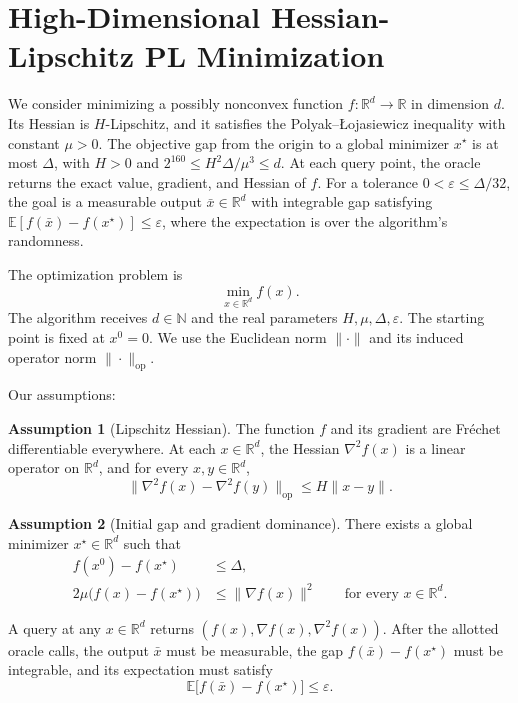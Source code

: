 \documentclass[10pt]{article}
\theoremstyle{definition}
\newtheorem{assumption}{Assumption}
\begin{document}
\section*{High-Dimensional Hessian-Lipschitz PL Minimization}
We consider minimizing a possibly nonconvex function $f:\mathbb{R}^d\to\mathbb{R}$ in dimension $d$. Its Hessian is $H$-Lipschitz, and it satisfies the Polyak--{\L}ojasiewicz inequality with constant $\mu>0$. The objective gap from the origin to a global minimizer $x^\star$ is at most $\Delta$, with $H>0$ and $2^{160}\leq H^2\Delta/\mu^3\leq d$. At each query point, the oracle returns the exact value, gradient, and Hessian of $f$. For a tolerance $0<\varepsilon\leq\Delta/32$, the goal is a measurable output $\bar{x}\in\mathbb{R}^d$ with integrable gap satisfying $\mathbb{E}[f(\bar{x})-f(x^\star)]\leq\varepsilon$, where the expectation is over the algorithm's randomness.

The optimization problem is
\[
\min_{x\in\mathbb{R}^d} f(x).
\]
The algorithm receives $d\in\mathbb{N}$ and the real parameters $H,\mu,\Delta,\varepsilon$. The starting point is fixed at $x^0=0$. We use the Euclidean norm $\|\cdot\|$ and its induced operator norm $\|\cdot\|_{\mathrm{op}}$.

Our assumptions:
\begin{assumption}[Lipschitz Hessian]
The function $f$ and its gradient are Fr\'echet differentiable everywhere. At each $x\in\mathbb{R}^d$, the Hessian $\nabla^2 f(x)$ is a linear operator on $\mathbb{R}^d$, and for every $x,y\in\mathbb{R}^d$,
\[
\|\nabla^2 f(x)-\nabla^2 f(y)\|_{\mathrm{op}}\leq H\|x-y\|.
\]
\end{assumption}

\begin{assumption}[Initial gap and gradient dominance]
There exists a global minimizer $x^\star\in\mathbb{R}^d$ such that
\[
\begin{aligned}
f(x^0)-f(x^\star)&\leq\Delta,\\
2\mu\bigl(f(x)-f(x^\star)\bigr)&\leq\|\nabla f(x)\|^2
\qquad\text{for every }x\in\mathbb{R}^d.
\end{aligned}
\]
\end{assumption}

A query at any $x\in\mathbb{R}^d$ returns $(f(x),\nabla f(x),\nabla^2 f(x))$. After the allotted oracle calls, the output $\bar{x}$ must be measurable, the gap $f(\bar{x})-f(x^\star)$ must be integrable, and its expectation must satisfy
\[
\mathbb{E}\bigl[f(\bar{x})-f(x^\star)\bigr]\leq\varepsilon.
\]
\end{document}
